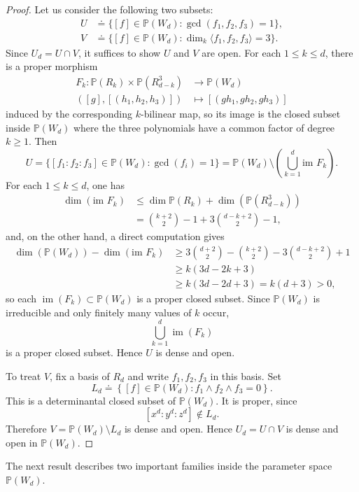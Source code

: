 \documentclass[11pt]{amsart} %
\theoremstyle{definition}
\def\NZQ{\mathbb}               %
\def\PP{{\NZQ P}}
\begin{document}
\begin{proof}
Let us consider the following two subsets:
\begin{align*}
U &\doteq \{[f] \in \mathbb{P}(W_d) : \gcd(f_1,f_2,f_3) = 1\},\\
V &\doteq \{[f] \in \mathbb{P}(W_d) : \dim_k \langle f_1, f_2, f_3 \rangle = 3\}.
\end{align*}
Since $U_d = U \cap V$, it suffices to show $U$ and $V$ are open. For each $1 \leq k \leq d$, there is a proper morphism
\begin{align*}
F_k : \mathbb{P}(R_k) \times \mathbb{P}(R_{d-k}^3) &\rightarrow \mathbb{P}(W_d)\\
( [g], [(h_1, h_2, h_3)] )&\longmapsto [(g h_1, g h_2, g h_3)]
\end{align*}
induced by the corresponding $k$-bilinear map, so its image is the closed subset inside $\mathbb{P}(W_d)$ where the three polynomials have a common factor of degree $k \geq 1$. Then
$$
U = \{[f_1: f_2: f_3] \in \mathbb{P}(W_d) : \gcd(f_i) = 1\} = \mathbb{P}(W_d) \setminus \left(\bigcup_{k=1}^{d} \text{im } F_k \right).
$$
For each $1 \leq k \leq d$, one has 
\begin{align*}
\dim(\text{im }F_k) &\leq \dim \mathbb{P}(R_k) + \dim(\mathbb{P}(R_{d-k}^3))\\
&= \binom{k+2}{2}-1 + 3 \binom{d-k+2}{2}-1,
\end{align*}
and, on the other hand, a direct computation gives
\begin{align*}
\dim(\mathbb{P}(W_d)) - \dim(\text{im }F_k) &\geq 3 \binom{d+2}{2} - \binom{k+2}{2}- 3\binom{d-k+2}{2} + 1\\
&\geq k(3d - 2k + 3)\\
&\geq k(3d-2d+3) = k(d+3) > 0,
\end{align*}
so each \(\operatorname{im}(F_k)\subset\PP(W_d)\) is a proper closed subset. Since $\PP(W_d)$ is irreducible and only
finitely many values of $k$ occur,
\[
\bigcup_{k=1}^d\operatorname{im}(F_k)
\]
is a proper closed subset. Hence $U$ is dense and open.

To treat $V$, fix a basis of $R_d$ and write $f_1,f_2,f_3$ in this
basis. Set
\[
L_d
\doteq
\left\{
[f]\in\PP(W_d):
f_1\wedge f_2\wedge f_3=0
\right\}.
\]
This is a determinantal closed subset of $\PP(W_d)$. It is proper,
since
\[
[x^d:y^d:z^d]\notin L_d.
\]
Therefore \(V=\PP(W_d)\setminus L_d\) is dense and open. Hence \(U_d=U\cap V\) is dense and open in $\PP(W_d)$.
\end{proof}

The next result describes two important families inside the parameter space $\mathbb{P}(W_d)$.
\end{document}
